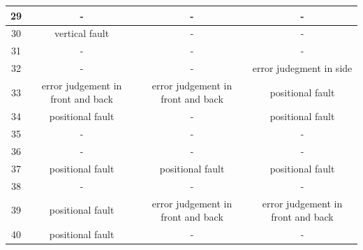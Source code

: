 \documentclass[journal,10pt]{IEEEtran}
\begin{document}
\begin{table}[ht]
{\begin{tabular}{|c|c|c|c|}
    29              & -                                 & -                                 & -                                 \\ \hline
    30              & vertical fault                    & -                                 & -                                 \\ \hline
    31              & -                                 & -                                 & -                                 \\ \hline
    32              & -                                 & -                                 & error judegment in side           \\ \hline
    33              & error judgement in front and back & error judgement in front and back & positional fault                  \\ \hline
    34              & positional fault                  & -                                 & positional fault                  \\ \hline
    35              & -                                 & -                                 & -                                 \\ \hline
    36              & -                                 & -                                 & -                                 \\ \hline
    37              & positional fault                  & positional fault                  & positional fault                  \\ \hline
    38              & -                                 & -                                 & -                                 \\ \hline
    39              & positional fault                  & error judgement in front and back & error judgement in front and back \\ \hline
    40              & positional fault                  & -                                 & -                                 \\ \hline
    \end{tabular}%
    }
\end{table}
\end{document}
